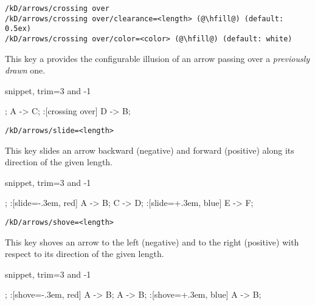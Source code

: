 \begin{lstlisting}
/kD/arrows/crossing over
/kD/arrows/crossing over/clearance=<length> (@\hfill@) (default: 0.5ex)
/kD/arrows/crossing over/color=<color> (@\hfill@) (default: white)
\end{lstlisting}

This key a provides the configurable illusion of an arrow passing
over a \emph{previously drawn} one.

\begin{tcblisting}{snippet, trim={3 and -1}}
\begin{kodi}[rectangular={4.5em}{1em}]
;
\mor A -> C;
\mor :[crossing over] D -> B;
\end{kodi}
\end{tcblisting}


\begin{lstlisting}
/kD/arrows/slide=<length>
\end{lstlisting}

This key slides an arrow backward (negative) and forward (positive) along its direction of the given length.

\begin{tcblisting}{snippet, trim={3 and -1}}
\begin{kodi}[rectangular={4.5em}{1em}]
;
\mor :[slide=-.3em, red] A -> B;
\mor C -> D;
\mor :[slide=+.3em, blue] E -> F;
\end{kodi}
\end{tcblisting}


\begin{lstlisting}
/kD/arrows/shove=<length>
\end{lstlisting}

This key shoves an arrow to the left (negative) and to the right (positive) with respect to its direction of the given length.

\begin{tcblisting}{snippet, trim={3 and -1}}
\begin{kodi}
;
\mor :[shove=-.3em, red] A -> B;
\mor A -> B;
\mor :[shove=+.3em, blue] A -> B;
\end{kodi}
\end{tcblisting}
